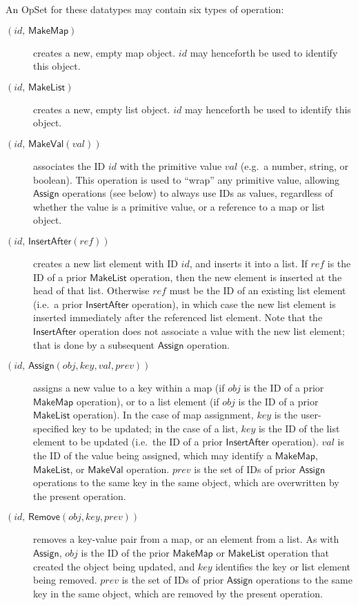 An OpSet for these datatypes may contain six types of operation:
\begin{description}
    \item[$(\mathit{id},\, \mathsf{MakeMap})$] creates a new, empty map object.
        $\mathit{id}$ may henceforth be used to identify this object.
    \item[$(\mathit{id},\, \mathsf{MakeList})$] creates a new, empty list object.
        $\mathit{id}$ may henceforth be used to identify this object.
    \item[$(\mathit{id},\, \mathsf{MakeVal}(\mathit{val}))$] associates the ID $\mathit{id}$ with the primitive value $\mathit{val}$ (e.g.\ a number, string, or boolean).
        This operation is used to ``wrap'' any primitive value, allowing $\mathsf{Assign}$ operations (see below) to always use IDs as values, regardless of whether the value is a primitive value, or a reference to a map or list object.
    \item[$(\mathit{id},\, \mathsf{InsertAfter}(\mathit{ref}))$] creates a new list element with ID $\mathit{id}$, and inserts it into a list.
        If $\mathit{ref}$ is the ID of a prior $\mathsf{MakeList}$ operation, then the new element is inserted at the head of that list.
        Otherwise $\mathit{ref}$ must be the ID of an existing list element (i.e.\ a prior $\mathsf{InsertAfter}$ operation), in which case the new list element is inserted immediately after the referenced list element.
        Note that the $\mathsf{InsertAfter}$ operation does not associate a value with the new list element; that is done by a subsequent $\mathsf{Assign}$ operation.
    \item[$(\mathit{id},\, \mathsf{Assign}(\mathit{obj}, \mathit{key}, \mathit{val}, \mathit{prev}))$] assigns a new value to a key within a map (if $\mathit{obj}$ is the ID of a prior $\mathsf{MakeMap}$ operation), or to a list element (if $\mathit{obj}$ is the ID of a prior $\mathsf{MakeList}$ operation).
        In the case of map assignment, $\mathit{key}$ is the user-specified key to be updated; in the case of a list, $\mathit{key}$ is the ID of the list element to be updated (i.e.\ the ID of a prior $\mathsf{InsertAfter}$ operation).
        $\mathit{val}$ is the ID of the value being assigned, which may identify a $\mathsf{MakeMap}$, $\mathsf{MakeList}$, or $\mathsf{MakeVal}$ operation.
        $\mathit{prev}$ is the set of IDs of prior $\mathsf{Assign}$ operations to the same key in the same object, which are overwritten by the present operation.
    \item[$(\mathit{id},\, \mathsf{Remove}(\mathit{obj}, \mathit{key}, \mathit{prev}))$] removes a key-value pair from a map, or an element from a list.
        As with $\mathsf{Assign}$, $\mathit{obj}$ is the ID of the prior $\mathsf{MakeMap}$ or $\mathsf{MakeList}$ operation that created the object being updated, and $\mathit{key}$ identifies the key or list element being removed.
        $\mathit{prev}$ is the set of IDs of prior $\mathsf{Assign}$ operations to the same key in the same object, which are removed by the present operation.
\end{description}

